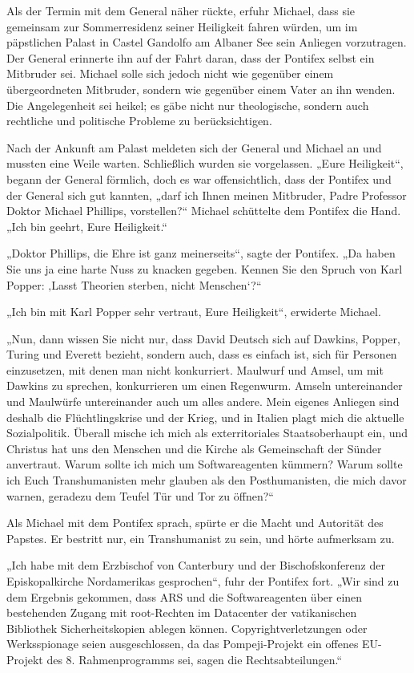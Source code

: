 \documentclass[
]{article}
\begin{document}
Als der Termin mit dem General näher rückte, erfuhr Michael, dass sie
gemeinsam zur Sommerresidenz seiner Heiligkeit fahren würden, um im
päpstlichen Palast in Castel Gandolfo am Albaner See sein Anliegen
vorzutragen. Der General erinnerte ihn auf der Fahrt daran, dass der
Pontifex selbst ein Mitbruder sei. Michael solle sich jedoch nicht wie
gegenüber einem übergeordneten Mitbruder, sondern wie gegenüber einem
Vater an ihn wenden. Die Angelegenheit sei heikel; es gäbe nicht nur
theologische, sondern auch rechtliche und politische Probleme zu
berücksichtigen.

Nach der Ankunft am Palast meldeten sich der General und Michael an und
mussten eine Weile warten. Schließlich wurden sie vorgelassen. „Eure
Heiligkeit``, begann der General förmlich, doch es war offensichtlich,
dass der Pontifex und der General sich gut kannten, „darf ich Ihnen
meinen Mitbruder, Padre Professor Doktor Michael Phillips,
vorstellen?{\kern0pt}`` Michael schüttelte dem Pontifex die Hand. „Ich
bin geehrt, Eure Heiligkeit.``

„Doktor Phillips, die Ehre ist ganz meinerseits``, sagte der Pontifex.
„Da haben Sie uns ja eine harte Nuss zu knacken gegeben. Kennen Sie den
Spruch von Karl Popper: ‚Lasst Theorien sterben, nicht
Menschen`?{\kern0pt}``

„Ich bin mit Karl Popper sehr vertraut, Eure Heiligkeit``, erwiderte
Michael.

„Nun, dann wissen Sie nicht nur, dass David Deutsch sich auf Dawkins,
Popper, Turing und Everett bezieht, sondern auch, dass es einfach ist,
sich für Personen einzusetzen, mit denen man nicht konkurriert. Maulwurf
und Amsel, um mit Dawkins zu sprechen, konkurrieren um einen Regenwurm.
Amseln untereinander und Maulwürfe untereinander auch um alles andere.
Mein eigenes Anliegen sind deshalb die Flüchtlingskrise und der Krieg,
und in Italien plagt mich die aktuelle Sozialpolitik. Überall mische ich
mich als exterritoriales Staatsoberhaupt ein, und Christus hat uns den
Menschen und die Kirche als Gemeinschaft der Sünder anvertraut. Warum
sollte ich mich um Softwareagenten kümmern? Warum sollte ich Euch
Transhumanisten mehr glauben als den Posthumanisten, die mich davor
warnen, geradezu dem Teufel Tür und Tor zu öffnen?{\kern0pt}``

Als Michael mit dem Pontifex sprach, spürte er die Macht und Autorität
des Papstes. Er bestritt nur, ein Transhumanist zu sein, und hörte
aufmerksam zu.

„Ich habe mit dem Erzbischof von Canterbury und der Bischofskonferenz
der Episkopalkirche Nordamerikas gesprochen``, fuhr der Pontifex fort.
„Wir sind zu dem Ergebnis gekommen, dass ARS und die Softwareagenten
über einen bestehenden Zugang mit root-Rechten im Datacenter der
vatikanischen Bibliothek Sicherheitskopien ablegen können.
Copyrightverletzungen oder Werksspionage seien ausgeschlossen, da das
Pompeji-Projekt ein offenes EU-Projekt des 8. Rahmenprogramms sei, sagen
die Rechtsabteilungen.``
\end{document}
